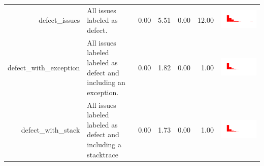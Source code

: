 \begin{table}[ht]
\begin{tabular}{rp{27em}rrrrc}
  defect\_issues & All issues labeled as defect. & 0.00 & 5.51 & 0.00 & 12.00 & \includegraphics[scale = 0.1, clip = true, trim= 50px 60px 50px 60px]{hist-5d0ab95cd3e300c21b0a40d6bec58e4c.pdf} \\ 
  defect\_with\_exception & All issues labeled labeled as defect and including an exception. & 0.00 & 1.82 & 0.00 & 1.00 & \includegraphics[scale = 0.1, clip = true, trim= 50px 60px 50px 60px]{hist-502028d1a7e2e77414e2f9f63e0bcd50.pdf} \\ 
  defect\_with\_stack & All issues labeled labeled as defect and including a stacktrace & 0.00 & 1.73 & 0.00 & 1.00 & \includegraphics[scale = 0.1, clip = true, trim= 50px 60px 50px 60px]{hist-dab0764147debd99066c84814d46d50e.pdf} \\ 

\end{tabular}
\end{table}
